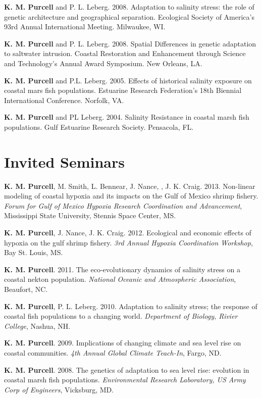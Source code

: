 \documentclass[letterpaper]{article}
\renewenvironment{itemize}{
  \begin{list}{}{
    \setlength{\leftmargin}{1em}
  }
}{
  \end{list}
}
\begin{document}
\begin{itemize}
		\item \textbf{K. M. Purcell} and P. L. Leberg. 2008. Adaptation to salinity stress: the role of genetic architecture and geographical separation. Ecological Society of America’s 93rd Annual International Meeting. Milwaukee, WI.
		\item \textbf{K. M. Purcell} and P. L. Leberg. 2008. Spatial Differences in genetic adaptation to saltwater intrusion. Coastal Restoration and Enhancement through Science and Technology’s Annual Award Symposium. New Orleans, LA.
		\item \textbf{K. M. Purcell} and P.L. Leberg. 2005. Effects of historical salinity exposure on coastal mars fish populations. Estuarine Research Federation’s 18th Biennial International Conference. Norfolk, VA.
		\item \textbf{K. M. Purcell} and PL Leberg. 2004. Salinity Resistance in coastal marsh fish populations. Gulf Estuarine Research Society. Pensacola, FL.
	\end{itemize}

\section*{Invited Seminars}
	\begin{itemize}
		 \item \textbf{K. M. Purcell}, M. Smith, L. Bennear, J. Nance, , J. K. Craig. 2013. Non-linear modeling of coastal hypoxia and its impacts on the Gulf of Mexico shrimp fishery. \textit{Forum for Gulf of Mexico Hypoxia Research Coordination and Advancement}, Mississippi State University, Stennis Space Center, MS.
		 \item \textbf{K. M. Purcell}, J. Nance, J. K. Craig. 2012. Ecological and economic effects of hypoxia on the gulf shrimp fishery. \textit{3rd Annual Hypoxia Coordination Workshop}, Bay St. Louis, MS.
		 \item \textbf{K. M. Purcell}. 2011. The eco-evolutionary dynamics of salinity stress on a coastal nekton population. \textit{National Oceanic and Atmospheric Association}, Beaufort, NC.
		 \item \textbf{K. M. Purcell}, P. L. Leberg. 2010. Adaptation to salinity stress; the response of coastal fish populations to a changing world. \textit{Department of Biology, Rivier College}, Nashua, NH.
		 \item \textbf{K. M. Purcell}. 2009. Implications of changing climate and sea level rise on coastal communities. \textit{4th Annual Global Climate Teach-In}, Fargo, ND.
		 \item \textbf{K. M. Purcell}. 2008. The genetics of adaptation to sea level rise: evolution in coastal marsh fish populations. \textit{Environmental Research Laboratory, US Army Corp of Engineers}, Vicksburg, MD.
	\end{itemize}
\end{document}
